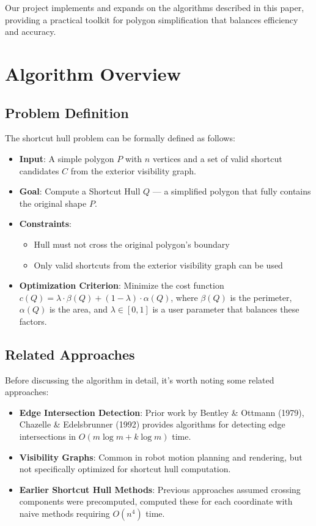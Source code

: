 \documentclass[11pt]{article}
\begin{document}
Our project implements and expands on the algorithms described in this paper, providing a practical toolkit for polygon simplification that balances efficiency and accuracy.

\section{Algorithm Overview}

\subsection{Problem Definition}

The shortcut hull problem can be formally defined as follows:

\begin{itemize}

    \item \textbf{Input}: A simple polygon $P$ with $n$ vertices and a set of valid shortcut candidates $C$ from the exterior visibility graph.
    \item \textbf{Goal}: Compute a Shortcut Hull $Q$ — a simplified polygon that fully contains the original shape $P$.
    \item \textbf{Constraints}:
    \begin{itemize}
        \item Hull must not cross the original polygon's boundary
        \item Only valid shortcuts from the exterior visibility graph can be used
    \end{itemize}
    \item \textbf{Optimization Criterion}: Minimize the cost function $c(Q) = \lambda \cdot \beta(Q) + (1 - \lambda) \cdot \alpha(Q)$, where $\beta(Q)$ is the perimeter, $\alpha(Q)$ is the area, and $\lambda \in [0, 1]$ is a user parameter that balances these factors.
\end{itemize}

\subsection{Related Approaches}

Before discussing the algorithm in detail, it's worth noting some related approaches:

\begin{itemize}

    \item \textbf{Edge Intersection Detection}: Prior work by Bentley \& Ottmann (1979), Chazelle \& Edelsbrunner (1992) provides algorithms for detecting edge intersections in $O(m \log m + k \log m)$ time.
    \item \textbf{Visibility Graphs}: Common in robot motion planning and rendering, but not specifically optimized for shortcut hull computation.
    \item \textbf{Earlier Shortcut Hull Methods}: Previous approaches assumed crossing components were precomputed, computed these for each coordinate with naive methods requiring $O(n^4)$ time.
\end{itemize}
\end{document}
